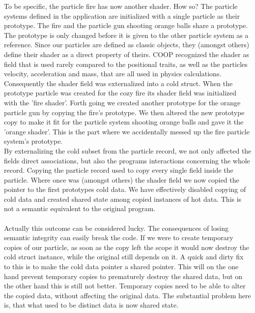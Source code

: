To be specific, the particle fire has now another shader. How so? The particle systems defined in the application are initialized with a single particle as their prototype. The fire and the particle gun shooting orange balls share a prototype. The prototype is only changed before it is given to the other particle system as a reference. Since our particles are defined as classic objects, they (amongst others) define their shader as a direct property of theirs. COOP recognized the shader as field that is used rarely compared to the positional traits, as well as the particles velocity, acceleration and mass, that are all used in physics calculations. Consequently the shader field was externalized into a cold struct. When the prototype particle was created for the cozy fire its shader field was initialized with the 'fire shader'. Forth going we created another prototype for the orange particle gun by copying the fire's prototype. We then altered the new prototype copy to make it fit for the particle system shooting orange balls and gave it the 'orange shader'. This is the part where we accidentally messed up the fire particle system's prototype.\\
By externalizing the cold subset from the particle record, we not only affected the fields direct associations, but also the programs interactions concerning the whole record. Copying the particle record used to copy every single field inside the particle. Where once was (amongst others) the shader field we now copied the pointer to the first prototypes cold data. We have effectively disabled copying of cold data  and created shared state among copied instances of hot data. This is not a semantic equivalent to the original program.\\\\
Actually this outcome can be considered lucky. The consequences of losing semantic integrity can easily break the code. If we were to create temporary copies of our particle, as soon as the copy left the scope it would now destroy the cold struct instance, while the original still depends on it. A quick and dirty fix to this is to make the cold data pointer a shared pointer. This will on the one hand prevent temporary copies to prematurely destroy the shared data, but on the other hand this is still not better. Temporary copies need to be able to alter the copied data, without affecting the original data. The substantial problem here is, that what used to be distinct data is now shared state.\\\\ 
